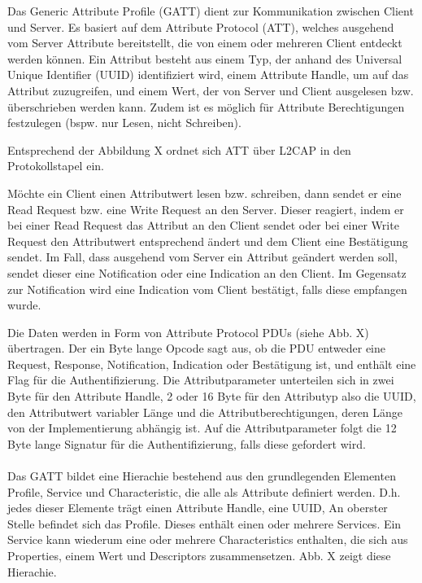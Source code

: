 Das Generic Attribute Profile (GATT) dient zur Kommunikation zwischen Client und Server. Es basiert auf dem Attribute Protocol (ATT), welches ausgehend vom Server Attribute bereitstellt, die von einem oder mehreren Client entdeckt werden können. Ein Attribut besteht aus einem Typ, der anhand des Universal Unique Identifier (UUID) identifiziert wird, einem Attribute Handle, um auf das Attribut zuzugreifen, und einem Wert, der von Server und Client ausgelesen bzw. überschrieben werden kann. Zudem ist es möglich für Attribute Berechtigungen festzulegen (bspw. nur Lesen, nicht Schreiben).

Entsprechend der Abbildung X ordnet sich ATT über L2CAP in den Protokollstapel ein.

Möchte ein Client einen Attributwert lesen bzw. schreiben, dann sendet er eine Read Request bzw. eine Write Request an den Server. Dieser reagiert, indem er bei einer Read Request das Attribut an den Client sendet oder bei einer Write Request den Attributwert entsprechend ändert und dem Client eine Bestätigung sendet. Im Fall, dass ausgehend vom Server ein Attribut geändert werden soll, sendet dieser eine Notification oder eine Indication an den Client. Im Gegensatz zur Notification wird eine Indication vom Client bestätigt, falls diese empfangen wurde.

Die Daten werden in Form von Attribute Protocol PDUs (siehe Abb. X) übertragen.
Der ein Byte lange Opcode sagt aus, ob die PDU entweder eine Request, Response, Notification, Indication oder Bestätigung ist, und enthält eine Flag für die Authentifizierung. Die Attributparameter unterteilen sich in zwei Byte für den Attribute Handle, 2 oder 16 Byte für den Attributyp also die UUID, den Attributwert variabler Länge und die Attributberechtigungen, deren Länge von der Implementierung abhängig ist. Auf die Attributparameter folgt die 12 Byte lange Signatur für die Authentifizierung, falls diese gefordert wird.
\\\\
Das GATT bildet eine Hierachie bestehend aus den grundlegenden Elementen Profile, Service und Characteristic, die alle als Attribute definiert werden. D.h. jedes dieser Elemente trägt einen Attribute Handle, eine UUID,  An oberster Stelle befindet sich das Profile. Dieses enthält einen oder mehrere Services. Ein Service kann wiederum eine oder mehrere Characteristics enthalten, die sich aus Properties, einem Wert und Descriptors zusammensetzen. Abb. X zeigt diese Hierachie.
